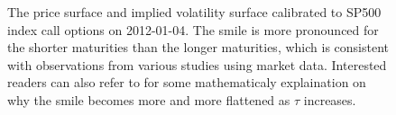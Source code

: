 \documentclass[letterpaper,12pt,titlepage,oneside,final]{book}
\numberwithin{equation}{section}
\theoremstyle{definition}
\begin{document}
\begin{figure}[htp!]
	\centering
	\caption{The price surface and implied volatility surface calibrated to SP500 index call options on 2012-01-04. The smile is more pronounced for the shorter maturities than the longer maturities, which is consistent with observations from various studies \cite{chance2017bias,rogers2010can} using market data. Interested readers can also refer to \cite{rogers2010can} for some mathematicaly explaination on why the smile becomes more and more flattened as $\tau$ increases.}
	\label{fig:CaliExp}
\end{figure}
\end{document}
